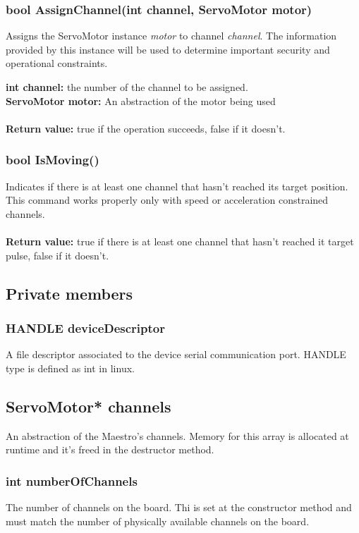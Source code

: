 \documentclass[letterpaper]{book}
\begin{document}
\subsubsection{bool AssignChannel(int channel, ServoMotor motor)}
Assigns the ServoMotor instance \textit{motor} to channel \textit{channel}. The information provided by this instance will be used to determine important security and operational constraints.

\textbf{int channel: }the number of the channel to be assigned.\\
\textbf{ServoMotor motor: } An abstraction of the motor being used\\\\
\textbf{Return value: } true if the operation succeeds, false if it doesn't.

\subsubsection{bool IsMoving()}
Indicates if there is at least one channel that hasn't reached its target position. This command works properly only with speed or acceleration constrained channels. \\\\
\textbf{Return value: } true if there is at least one channel that hasn't reached it target pulse, false if  it doesn't.

\subsection{Private members}

\subsubsection{HANDLE deviceDescriptor}
A file descriptor associated to the device serial communication port. HANDLE type is defined as int in linux.
\subsection{	ServoMotor* channels}
An abstraction of the Maestro's channels. Memory for this array is allocated at runtime and it's freed in the destructor method.

\subsubsection{int numberOfChannels}
The number of channels on the board. Thi is set at the constructor method and must match the number of physically available channels on the board.
\end{document}
